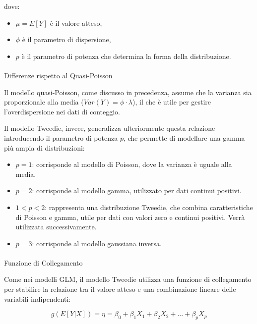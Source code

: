 \documentclass[
  italian,
  a4paper,
  a4paper,
  twoside,
  open=right,
  12pt]{scrbook}
\makeatletter
\let\oldparagraph\paragraph
\renewcommand{\paragraph}{
    \@ifstar
      \xxxParagraphStar
      \xxxParagraphNoStar
  }
\newcommand{\xxxParagraphStar}[1]{\oldparagraph*{#1}\mbox{}}
\newcommand{\xxxParagraphNoStar}[1]{\oldparagraph{#1}\mbox{}}
\theoremstyle{definition}
\theoremstyle{remark}
\makeatother
\begin{document}
dove:

\begin{itemize}
\item
  \(\mu = E[Y]\) è il valore atteso,
\item
  \(\phi\) è il parametro di dispersione,
\item
  \(p\) è il parametro di potenza che determina la forma della
  distribuzione.
\end{itemize}

\paragraph{Differenze rispetto al
Quasi-Poisson}\label{differenze-rispetto-al-quasi-poisson}

Il modello quasi-Poisson, come discusso in precedenza, assume che la
varianza sia proporzionale alla media (\(Var(Y) = \phi \cdot \lambda\)),
il che è utile per gestire l'overdispersione nei dati di conteggio.

Il modello Tweedie, invece, generalizza ulteriormente questa relazione
introducendo il parametro di potenza \(p\), che permette di modellare
una gamma più ampia di distribuzioni:

\begin{itemize}
\item
  \textbf{\(p = 1\)}: corrisponde al modello di Poisson, dove la
  varianza è uguale alla media.
\item
  \textbf{\(p = 2\)}: corrisponde al modello gamma, utilizzato per dati
  continui positivi.
\item
  \textbf{\(1 < p < 2\)}: rappresenta una distribuzione Tweedie, che
  combina caratteristiche di Poisson e gamma, utile per dati con valori
  zero e continui positivi. Verrà utilizzata successivamente.
\item
  \textbf{\(p = 3\)}: corrisponde al modello gaussiana inversa.
\end{itemize}

\paragraph{Funzione di Collegamento}\label{funzione-di-collegamento}

Come nei modelli GLM, il modello Tweedie utilizza una funzione di
collegamento per stabilire la relazione tra il valore atteso e una
combinazione lineare delle variabili indipendenti:

\[
g(E[Y|X]) = \eta = \beta_0 + \beta_1 X_1 + \beta_2 X_2 + \ldots + \beta_p X_p
\]
\end{document}
